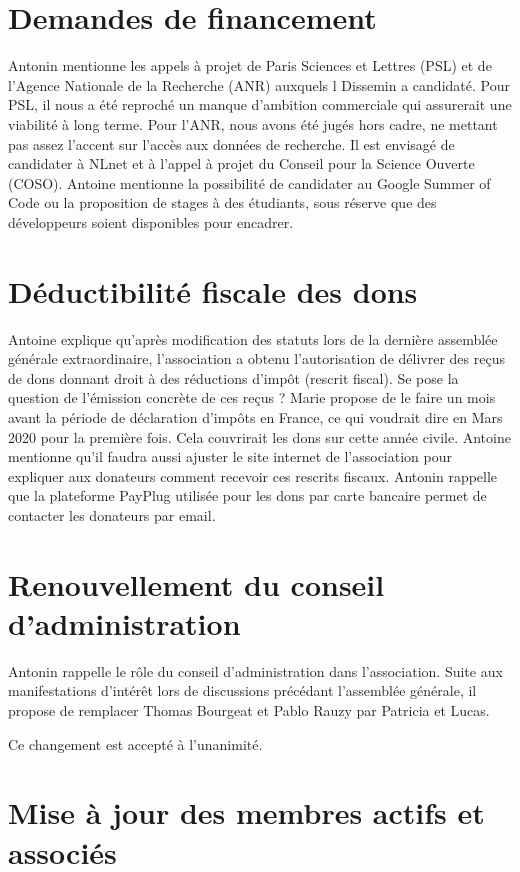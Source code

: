 \documentclass[a4paper]{article}
\begin{document}
\section{Demandes de financement}

Antonin mentionne les appels à projet de Paris Sciences et Lettres (PSL) et de l'Agence Nationale de la Recherche (ANR) auxquels l Dissemin a candidaté.
Pour PSL, il nous a été reproché un manque d'ambition commerciale qui assurerait une viabilité à long terme. Pour l'ANR, nous avons été jugés hors cadre, ne mettant pas assez l'accent sur l'accès aux données de recherche.
Il est envisagé de candidater à NLnet et à l'appel à projet du Conseil pour la Science Ouverte (COSO).
Antoine mentionne la possibilité de candidater au Google Summer of Code ou la proposition de stages à des étudiants, sous réserve que des développeurs soient disponibles pour encadrer.

\section{Déductibilité fiscale des dons}
Antoine explique qu'après modification des statuts lors de la dernière assemblée générale extraordinaire, l'association a obtenu l'autorisation de délivrer des reçus de dons donnant droit à des réductions d'impôt (rescrit fiscal).
Se pose la question de l'émission concrète de ces reçus ?
Marie propose de le faire un mois avant la période de déclaration d'impôts en France, ce qui voudrait dire en Mars 2020 pour la première fois. Cela couvrirait les dons sur cette année civile. Antoine mentionne qu'il faudra aussi ajuster le site internet de
l'association pour expliquer aux donateurs comment recevoir ces rescrits fiscaux.
Antonin rappelle que la plateforme PayPlug utilisée pour les dons par carte bancaire
permet de contacter les donateurs par email.

\section{Renouvellement du conseil d'administration}

Antonin rappelle le rôle du conseil d'administration dans l'association.
Suite aux manifestations d'intérêt lors de discussions précédant l'assemblée générale,
il propose de remplacer Thomas Bourgeat et Pablo Rauzy par Patricia et Lucas.

Ce changement est accepté à l'unanimité.

\section{Mise à jour des membres actifs et associés}
\end{document}
